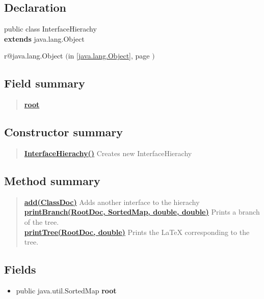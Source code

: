 \documentclass[11pt,a4paper]{report}
\makeatletter
\newcommand{\refdefined}[1]{
\expandafter\ifx\csname r@#1\endcsname\relax
\relax\else
{$($in \ref{#1}, page \pageref{#1}$)$}\fi}
\makeatother
\begin{document}
{{{\subsection{Declaration}{
\small public class InterfaceHierachy
\\ {\bf  extends} java.lang.Object
\refdefined{java.lang.Object}}
\subsection{Field summary}{
\begin{verse}
\hyperlink{org.stfm.texdoclet.InterfaceHierachy.root}{{\bf root}} \\
\end{verse}
}
\subsection{Constructor summary}{
\begin{verse}
\hyperlink{org.stfm.texdoclet.InterfaceHierachy()}{{\bf InterfaceHierachy()}} Creates new InterfaceHierachy\\
\end{verse}
}
\subsection{Method summary}{
\begin{verse}
\hyperlink{org.stfm.texdoclet.InterfaceHierachy.add(com.sun.javadoc.ClassDoc)}{{\bf add(ClassDoc)}} Adds another interface to the hierachy\\
\hyperlink{org.stfm.texdoclet.InterfaceHierachy.printBranch(com.sun.javadoc.RootDoc, java.util.SortedMap, double, double)}{{\bf printBranch(RootDoc, SortedMap, double, double)}} Prints a branch of the tree.\\
\hyperlink{org.stfm.texdoclet.InterfaceHierachy.printTree(com.sun.javadoc.RootDoc, double)}{{\bf printTree(RootDoc, double)}} Prints the \LaTeX{} corresponding to the tree.\\
\end{verse}
}
\subsection{Fields}{
\begin{itemize}
\item{
\label{org.stfm.texdoclet.InterfaceHierachy.root}\hypertarget{org.stfm.texdoclet.InterfaceHierachy.root}{public java.util.SortedMap {\bf  root}}
}
\end{itemize}
}
}}}
\end{document}
